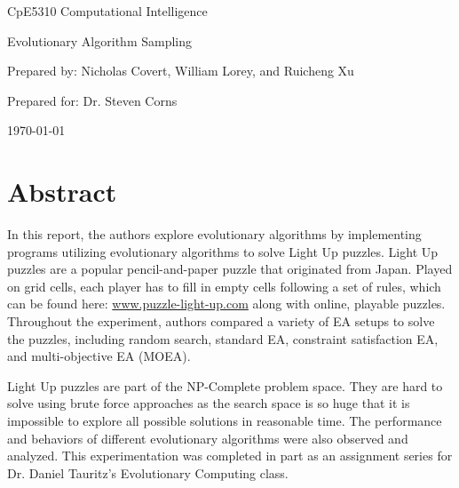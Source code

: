 \documentclass[11pt]{article}
\begin{document}
\thispagestyle{empty}
\begin{center}
\begin{minipage}{0.75\linewidth}
\centering

\vspace{6.2cm}

{\Large CpE5310 Computational Intelligence\par}
\vspace{0.2cm}

{\large Evolutionary Algorithm Sampling\par}
\vspace{3cm}

{\large Prepared by: Nicholas Covert, William Lorey, and Ruicheng Xu\par}
\vspace{0.2cm}

{\large Prepared for: Dr. Steven Corns}
\vspace{3cm}

{\large \today}

\end{minipage}
\end{center}

\clearpage

\tableofcontents

\clearpage


\section{Abstract}

In this report, the authors explore  evolutionary algorithms
by implementing programs utilizing evolutionary algorithms to 
solve Light Up puzzles. Light Up puzzles are a popular pencil-and-paper
puzzle that originated from Japan. Played on grid cells, each player
has to fill in empty cells following a set of rules, which 
can be found here: \url{www.puzzle-light-up.com} along with
online, playable puzzles. Throughout the experiment, 
authors compared a variety of EA setups to solve the puzzles, 
including random search, standard EA, constraint satisfaction 
EA, and multi-objective EA (MOEA). 

Light Up puzzles are part of the NP-Complete 
problem space. They are hard to solve using brute force approaches as the 
search space is so huge that it is impossible to explore all 
possible solutions in reasonable time. The performance and 
behaviors of different evolutionary algorithms were also
observed and analyzed. This experimentation was completed in part as an
assignment series for Dr. Daniel Tauritz's 
Evolutionary Computing class. 
\end{document}
